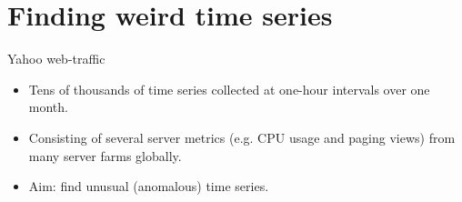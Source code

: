 \documentclass[14pt]{beamer}
\begin{document}




\section{Finding weird time series}

\begin{frame}{Yahoo web-traffic}\vspace*{-0.2cm}\fontsize{13}{15}\sf
  \begin{itemize}
    \item Tens of thousands of time series collected at one-hour intervals over one month.
    \item Consisting of several server metrics (e.g. CPU usage and paging views)
      from many server farms globally.
\item Aim: find unusual (anomalous) time series.
  \end{itemize}\vspace*{10cm}
\end{frame}
\end{document}
